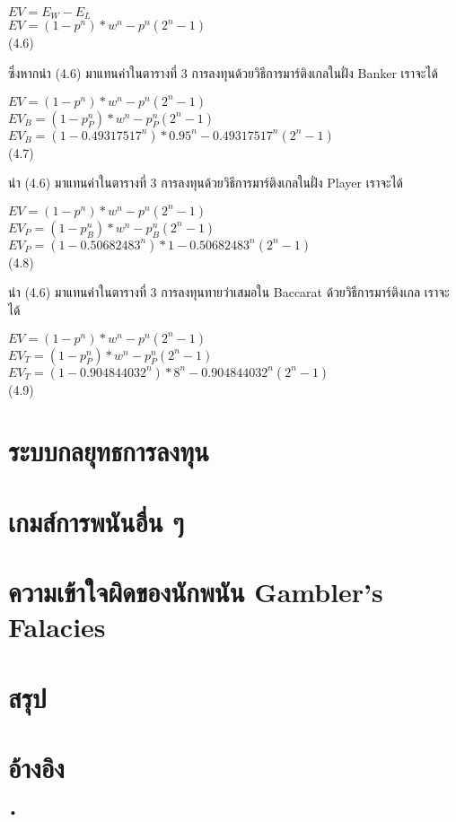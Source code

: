 \documentclass[12pt]{article}
\begin{document}
\begin{center}
$EV=E_W-E_L$\\
$EV=(1-p^n)*w^n - p^n(2^n-1)$\\
(4.6)\\
\end{center}

ซึ่งหากนำ (4.6) มาแทนค่าในตารางที่ 3 การลงทุนด้วยวิธีการมาร์ติงเกลในฝั่ง Banker เราจะได้

\begin{center}
$EV=(1-p^n)*w^n - p^n(2^n-1)$\\
$EV_B=(1-p_P^n)*w^n - p_P^n(2^n-1)$\\
$EV_B=(1-0.49317517^n)*0.95^n - 0.49317517^n(2^n-1)$\\
(4.7)\\
\end{center}

นำ (4.6) มาแทนค่าในตารางที่ 3 การลงทุนด้วยวิธีการมาร์ติงเกลในฝั่ง Player เราจะได้

\begin{center}
$EV=(1-p^n)*w^n - p^n(2^n-1)$\\
$EV_P=(1-p_B^n)*w^n - p_B^n(2^n-1)$\\
$EV_P=(1-0.50682483^n)*1 - 0.50682483^n(2^n-1)$\\
(4.8)
\end{center}

นำ (4.6) มาแทนค่าในตารางที่ 3 การลงทุนทายว่าเสมอใน Baccarat ด้วยวิธีการมาร์ติงเกล เราจะได้

\begin{center}
$EV=(1-p^n)*w^n - p^n(2^n-1)$\\
$EV_T=(1-p_P^n)*w^n - p_P^n(2^n-1)$\\
$EV_T=(1-0.904844032^n)*8^n - 0.904844032^n(2^n-1)$\\
(4.9)
\end{center}

\newpage
\section{ระบบกลยุทธการลงทุน}

\newpage
\section{เกมส์การพนันอื่น ๆ}

\newpage
\section{ความเข้าใจผิดของนักพนัน Gambler's Falacies}

\newpage
\section{สรุป}

\newpage
\section{อ้างอิง}





•
\end{document}
